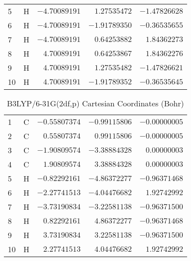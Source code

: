 \documentclass[10pt,oneside]{article}
\begin{document}
\begin{table}[h!]
\begin{multicols}{2}
\begin{tabular}{llrrr}
5  & H  & $-4.70089191$ & $ 1.27535472$ & $-1.47826628$ \\
6  & H  & $-4.70089191$ & $-1.91789350$ & $-0.36535655$ \\
7  & H  & $-4.70089191$ & $ 0.64253882$ & $ 1.84362273$ \\
8  & H  & $ 4.70089191$ & $ 0.64253867$ & $ 1.84362276$ \\
9  & H  & $ 4.70089191$ & $ 1.27535482$ & $-1.47826621$ \\
10 & H  & $ 4.70089191$ & $-1.91789352$ & $-0.36535645$ \\
\bottomrule
\end{tabular}
\end{multicols}
\end{table}

\begin{table}[h]
\centering
\caption{B3LYP/6-31G(2df,p) Cartesian Coordinates (Bohr)}
\begin{tabular}{llrrr}
\toprule
1  & C  & $-0.55807374$ & $-0.99115806$ & $-0.00000005$ \\
2  & C  & $ 0.55807374$ & $ 0.99115806$ & $-0.00000005$ \\
3  & C  & $-1.90809574$ & $-3.38884328$ & $ 0.00000003$ \\
4  & C  & $ 1.90809574$ & $ 3.38884328$ & $ 0.00000003$ \\
5  & H  & $-0.82292161$ & $-4.86372277$ & $-0.96371468$ \\
6  & H  & $-2.27741513$ & $-4.04476682$ & $ 1.92742992$ \\
7  & H  & $-3.73190834$ & $-3.22581138$ & $-0.96371500$ \\
8  & H  & $ 0.82292161$ & $ 4.86372277$ & $-0.96371468$ \\
9  & H  & $ 3.73190834$ & $ 3.22581138$ & $-0.96371500$ \\
10 & H  & $ 2.27741513$ & $ 4.04476682$ & $ 1.92742992$ \\
\bottomrule
\end{tabular}
\end{table}
\end{document}
